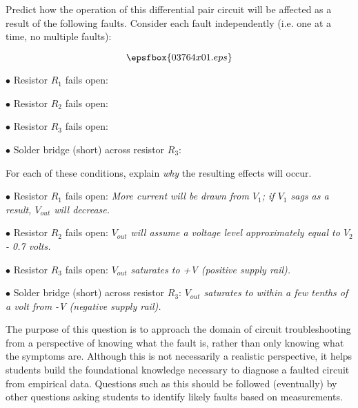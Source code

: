 

Predict how the operation of this differential pair circuit will be affected as a result of the following faults.  Consider each fault independently (i.e. one at a time, no multiple faults):

$$\epsfbox{03764x01.eps}$$

\medskip
\item{$\bullet$} Resistor $R_1$ fails open:
\vskip 5pt
\item{$\bullet$} Resistor $R_2$ fails open:
\vskip 5pt
\item{$\bullet$} Resistor $R_3$ fails open:
\vskip 5pt
\item{$\bullet$} Solder bridge (short) across resistor $R_3$:
\medskip

For each of these conditions, explain {\it why} the resulting effects will occur.







\medskip
\item{$\bullet$} Resistor $R_1$ fails open: {\it More current will be drawn from $V_1$; if $V_1$ sags as a result, $V_{out}$ will decrease.}
\vskip 5pt
\item{$\bullet$} Resistor $R_2$ fails open: {\it $V_{out}$ will assume a voltage level approximately equal to $V_2$ - 0.7 volts.}
\vskip 5pt
\item{$\bullet$} Resistor $R_3$ fails open: {\it $V_{out}$ saturates to +V (positive supply rail).}
\vskip 5pt
\item{$\bullet$} Solder bridge (short) across resistor $R_3$: {\it $V_{out}$ saturates to within a few tenths of a volt from -V (negative supply rail).}
\medskip







The purpose of this question is to approach the domain of circuit troubleshooting from a perspective of knowing what the fault is, rather than only knowing what the symptoms are.  Although this is not necessarily a realistic perspective, it helps students build the foundational knowledge necessary to diagnose a faulted circuit from empirical data.  Questions such as this should be followed (eventually) by other questions asking students to identify likely faults based on measurements.




